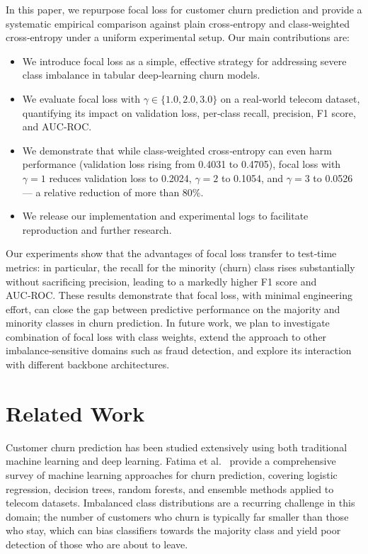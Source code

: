 \documentclass[11pt,a4paper]{article}
\begin{document}
In this paper, we repurpose focal loss for customer churn prediction and provide a systematic empirical comparison against plain cross‑entropy and class‑weighted cross‑entropy under a uniform experimental setup. Our main contributions are:
\begin{itemize}
\item We introduce focal loss as a simple, effective strategy for addressing severe class imbalance in tabular deep‑learning churn models.
\item We evaluate focal loss with $\gamma \in \{1.0, 2.0, 3.0\}$ on a real‑world telecom dataset, quantifying its impact on validation loss, per‑class recall, precision, F1 score, and AUC‑ROC.
\item We demonstrate that while class‑weighted cross‑entropy can even harm performance (validation loss rising from 0.4031 to 0.4705), focal loss with $\gamma=1$ reduces validation loss to 0.2024, $\gamma=2$ to 0.1054, and $\gamma=3$ to 0.0526 — a relative reduction of more than 80\%.
\item We release our implementation and experimental logs to facilitate reproduction and further research.
\end{itemize}

Our experiments show that the advantages of focal loss transfer to test‑time metrics: in particular, the recall for the minority (churn) class rises substantially without sacrificing precision, leading to a markedly higher F1 score and AUC‑ROC. These results demonstrate that focal loss, with minimal engineering effort, can close the gap between predictive performance on the majority and minority classes in churn prediction. In future work, we plan to investigate combination of focal loss with class weights, extend the approach to other imbalance‑sensitive domains such as fraud detection, and explore its interaction with different backbone architectures.

\section{Related Work}
\label{sec:related}
Customer churn prediction has been studied extensively using both traditional machine learning and deep learning. Fatima et al.~\cite{fatima2024churn} provide a comprehensive survey of machine learning approaches for churn prediction, covering logistic regression, decision trees, random forests, and ensemble methods applied to telecom datasets. Imbalanced class distributions are a recurring challenge in this domain; the number of customers who churn is typically far smaller than those who stay, which can bias classifiers towards the majority class and yield poor detection of those who are about to leave.
\end{document}

